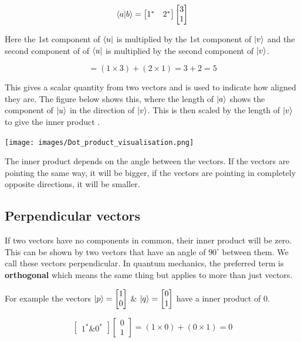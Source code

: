 \documentclass{book}
\begin{document}
 $$
\braket{a|b} = \begin{bmatrix} 1^* & 2^* \end{bmatrix}  \begin{bmatrix} 3 \\ 1 \end{bmatrix}
 $$

Here the 1st component of $\bra{u}$ is multiplied by the 1st component of $\ket{v}$ and the second component of of $\bra{u}$ is multiplied by the second component of $\ket{v}$.

$$
= (1 \times 3) + (2 \times 1) = 3 + 2 = 5 
$$

This gives a scalar quantity from two vectors and is used to indicate how aligned they are. The figure below shows this, where the length of $\ket{a}$ shows the component of $\ket{u}$ in the direction of $\ket{v}$. This is then scaled by the length of $\ket{v}$ to give the inner product . 

\texttt{[image: images/Dot\_product\_visualisation.png]}


The inner product depends on the angle between the vectors. If the vectors are pointing the same way, it will be bigger, if the vectors are pointing in completely opposite directions, it will be smaller. 

\subsection{ Perpendicular vectors }

If two vectors have no components in common, their inner product will be zero. This can be shown by two vectors that have an angle of $ 90^{\circ} $ between them.  We call these vectors perpendicular. In quantum mechanics, the preferred term is \textbf{orthogonal} which means the same thing but applies to more than just vectors. 

For example the vectors $\ket{p} = \begin{bmatrix} 1 \\ 0 \end{bmatrix}$ \& $\ket{q} = \begin{bmatrix} 0 \\ 1 \end{bmatrix}$ have a inner product  of 0. 

$$ \begin{bmatrix} 1^* \& 0^* \end{bmatrix}  \begin{bmatrix} 0 \\ 1 \end{bmatrix} = (1 \times 0) + (0 \times 1) = 0$$
\end{document}
